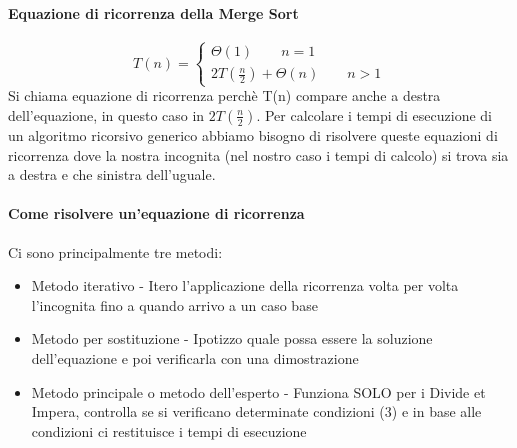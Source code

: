 \paragraph*{Equazione di ricorrenza della Merge Sort}
\begin{equation*}
    T(n)=
    \begin{cases}
        \Theta(1) \qquad n=1 \\
        2T(\frac{n}{2}) + \Theta(n) \qquad n>1
    \end{cases}
\end{equation*}
Si chiama equazione di ricorrenza perchè T(n) compare anche a destra dell'equazione, in questo caso
in $2T(\frac{n}{2})$. Per calcolare i tempi di esecuzione di un algoritmo ricorsivo generico abbiamo
bisogno di risolvere queste equazioni di ricorrenza dove la nostra incognita (nel nostro caso i tempi di calcolo) si trova
sia a destra e che sinistra dell'uguale.
\paragraph*{Come risolvere un'equazione di ricorrenza} Ci sono principalmente tre metodi:
\begin{itemize}
    \item Metodo iterativo - Itero l'applicazione della ricorrenza volta per volta l'incognita fino a quando arrivo a un caso base
    \item Metodo per sostituzione - Ipotizzo quale possa essere la soluzione dell'equazione e poi verificarla
    con una dimostrazione
    \item Metodo principale o metodo dell'esperto - Funziona SOLO per i Divide et Impera, controlla se si
    verificano determinate condizioni (3) e in base alle condizioni ci restituisce i tempi di esecuzione
\end{itemize}
